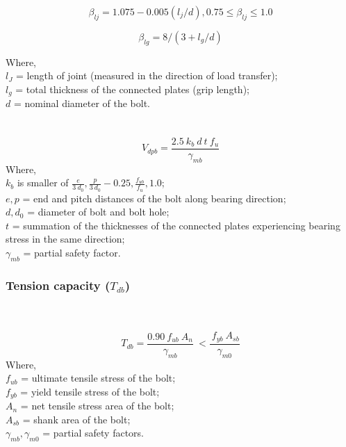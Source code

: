 \documentclass[11.5pt,a4paper,oneside]{report}
\newcounter{subsubsubsection}[subsubsection]
\begin{document}
\begin{Form}
\begin{equation}
	\beta_{lj} = 1.075 - 0.005(l_j/d), 0.75 \le \beta_{lj} \le 1.0
\end{equation}

\begin{equation}
	\beta_{lg} = 8/(3 + l_g/d)
\end{equation}

Where, \\
\indent $l_J$ = length of joint (measured in the direction of load transfer); \\
\indent $l_g$ = total thickness of the connected plates (grip length); \\
\indent $d$ = nominal diameter of the bolt. \\
\qquad \qquad [Reference: Cl. 10.3.4, IS 800:2007] \\ \\
\label{bearing_capacity}
\begin{equation}
	V_{dpb} = \frac{2.5~ k_b~ d~ t~ f_u}{\gamma_{mb}}
\end{equation}
Where, \\
\indent $k_b$ is smaller of $\frac{e}{3~d_0}, \frac{p}{3~d_0} - 0.25, \frac{f_{ub}}{f_u}, 1.0$; \\
\indent $e, p$ = end and pitch distances of the bolt along bearing direction; \\
\indent $d, d_0$ = diameter of bolt and bolt hole; \\
\indent $t$ = summation of the thicknesses of the connected plates experiencing bearing stress in the same direction; \\
\indent $\gamma_{mb}$ = partial safety factor.
\subsubsection{Tension capacity (\boldmath $T_{db}$)}
\label{tension_bearing}
\qquad \qquad [Reference: Cl. 10.3.5, IS 800:2007] \\ \\
\begin{equation}
T_{db} = \frac{0.90~ f_{ub}~ A_n}{\gamma_{mb}}~ < \frac{~f_{yb}~ A_{sb}}{\gamma_{m0}}
\end{equation}
Where, \\
\indent $f_{ub}$ = ultimate tensile stress of the bolt; \\
\indent $f_{yb}$ = yield tensile stress of the bolt; \\
\indent $A_n$ = net tensile stress area of the bolt; \\
\indent $A_{sb}$ = shank area of the bolt; \\
\indent $\gamma_{mb}, \gamma_{m0}$ = partial safety factors. \\

\end{Form}
\end{document}
